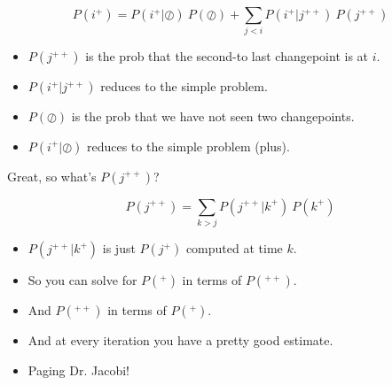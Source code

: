 \documentclass[pdf,letterpaper,allen]{prosper}
\renewcommand{\P}{\ P}
\newcommand{\jc}{\oslash}
\begin{document}
\begin{slide}{}

\[ P(i^+) = P(i^+ | \jc) \P(\jc) + \sum_{j<i} P(i^+ | j^{++}) \P(j^{++})  \]


\begin{itemize}

\item $P(j^{++})$ is the prob that the second-to last changepoint is at $i$.

\item $P(i^+ | j^{++})$ reduces to the simple problem.

\item $P(\jc)$ is the prob that we have not seen two changepoints.

\item $P(i^+ | \jc)$ reduces to the simple problem (plus).

\end{itemize}


Great, so what's $P(j^{++})$?

\end{slide}



\begin{slide}{}

\[ P(j^{++}) = \sum_{k>j} P(j^{++} | k^+) \P(k^+) \]

\begin{itemize}

\item $P(j^{++} | k^+)$ is just $P(j^+)$ computed at time $k$.

\item So you can solve for $P(^+)$ in terms of $P(^{++})$.

\item And $P(^{++})$ in terms of $P(^+)$.

\item And at every iteration you have a pretty good estimate.

\item Paging Dr. Jacobi!

\end{itemize}



\end{slide}
\end{document}
